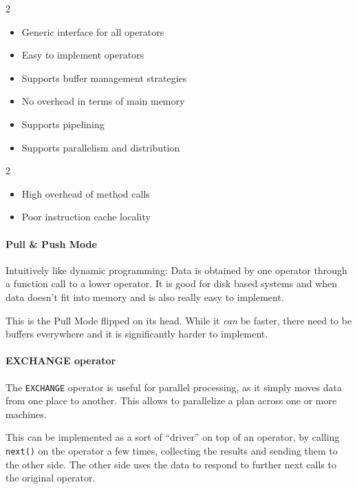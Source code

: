 \begin{multicols}{2}
    \begin{itemize}
        \item Generic interface for all operators
        \item Easy to implement operators
        \item Supports buffer management strategies
        \item No overhead in terms of main memory
        \item Supports pipelining
        \item Supports parallelism and distribution
    \end{itemize}
\end{multicols}

\begin{multicols}{2}
    \begin{itemize}
        \item High overhead of method calls
        \item Poor instruction cache locality
    \end{itemize}
\end{multicols}


\paragraph{Pull \& Push Mode}
 Intuitively like dynamic programming: Data is obtained by one operator through a function call to a lower operator.
It is good for disk based systems and when data doesn't fit into memory and is also really easy to implement.

 This is the Pull Mode flipped on its head.
While it \textit{can} be faster, there need to be buffers everywhere and it is significantly harder to implement.


\paragraph{EXCHANGE operator}
The \texttt{EXCHANGE} operator is useful for parallel processing, as it simply moves data from one place to another.
This allows to parallelize a plan across one or more machines.

This can be implemented as a sort of ``driver'' on top of an operator, by calling \texttt{next()} on the operator a few times,
collecting the results and sending them to the other side.
The other side uses the data to respond to further next calls to the original operator.
